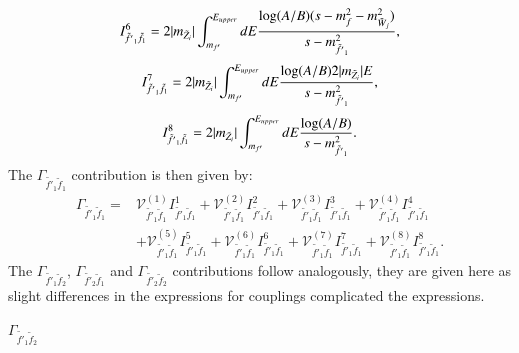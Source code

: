 \documentclass[final,3p,times,pdflatex]{elsarticle}
\begin{document}
\begin{equation}
\begin{aligned}
I_{\tilde{f'}_1 \tilde{f}_1}^{6} = 2|m_{\tilde{Z}_i}| \int_{m_{f'}}^{E_{upper}} dE {\log(A/B) (s-m_{f}^2 - m_{\tilde{W}_j}^2)  \over s - m_{\tilde{f'}_1}^2},
\end{aligned}
\end{equation}
\begin{equation}
\begin{aligned}
I_{\tilde{f'}_1 \tilde{f}_1}^{7} = 2|m_{\tilde{Z}_i}| \int_{m_{f'}}^{E_{upper}} dE {\log(A/B) 2|m_{\tilde{Z}_i}|E  \over s - m_{\tilde{f'}_1}^2},
\end{aligned}
\end{equation}
\begin{equation}
\begin{aligned}
I_{\tilde{f'}_1 \tilde{f}_1}^{8} = 2|m_{\tilde{Z}_i}| \int_{m_{f'}}^{E_{upper}} dE {\log(A/B) \over s - m_{\tilde{f'}_1}^2}.
\end{aligned}
\end{equation}
The $\Gamma_{\tilde{f'}_1 \tilde{f}_1}$ contribution is then given by:
\begin{equation}
\begin{aligned}
\Gamma_{\tilde{f'}_1 \tilde{f}_1} = & \mathcal{V}_{\tilde{f'}_1 \tilde{f}_1}^{(1)} I_{\tilde{f'}_1 \tilde{f}_1}^{1} + \mathcal{V}_{\tilde{f'}_1 \tilde{f}_1}^{(2)} I_{\tilde{f'}_1 \tilde{f}_1}^{2} + \mathcal{V}_{\tilde{f'}_1 \tilde{f}_1}^{(3)} I_{\tilde{f'}_1 \tilde{f}_1}^{3} + \mathcal{V}_{\tilde{f'}_1 \tilde{f}_1}^{(4)} I_{\tilde{f'}_1 \tilde{f}_1}^{4} \\ & + \mathcal{V}_{\tilde{f'}_1 \tilde{f}_1}^{(5)} I_{\tilde{f'}_1 \tilde{f}_1}^{5} + \mathcal{V}_{\tilde{f'}_1 \tilde{f}_1}^{(6)} I_{\tilde{f'}_1 \tilde{f}_1}^{6} + \mathcal{V}_{\tilde{f'}_1 \tilde{f}_1}^{(7)} I_{\tilde{f'}_1 \tilde{f}_1}^{7} + \mathcal{V}_{\tilde{f'}_1 \tilde{f}_1}^{(8)} I_{\tilde{f'}_1 \tilde{f}_1}^{8}.
\end{aligned}
\end{equation}
The $\Gamma_{\tilde{f'}_1 \tilde{f}_2}$, $\Gamma_{\tilde{f'}_2 \tilde{f}_1}$ and $\Gamma_{\tilde{f'}_2 \tilde{f}_2}$ contributions follow analogously, they are given here as slight differences in the expressions for couplings complicated the expressions.

\textbf{\underline{$\Gamma_{\tilde{f'}_1 \tilde{f}_2}$}}
\end{document}
